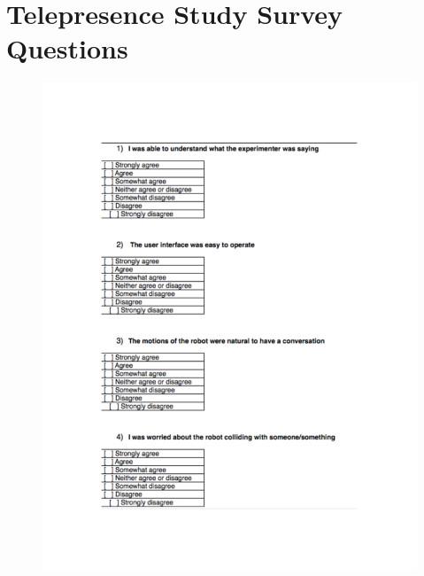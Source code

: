 \documentclass[12pt]{gatech-thesis}
\begin{document}
\chapter{Telepresence Study Survey Questions}
\label{chapter:telepresence_user_study_survey_questions}

\begin{figure}[ht!]
\includegraphics[width=1.0\textwidth]{pics/telepresence_survey_0}
\end{figure}
\end{document}
